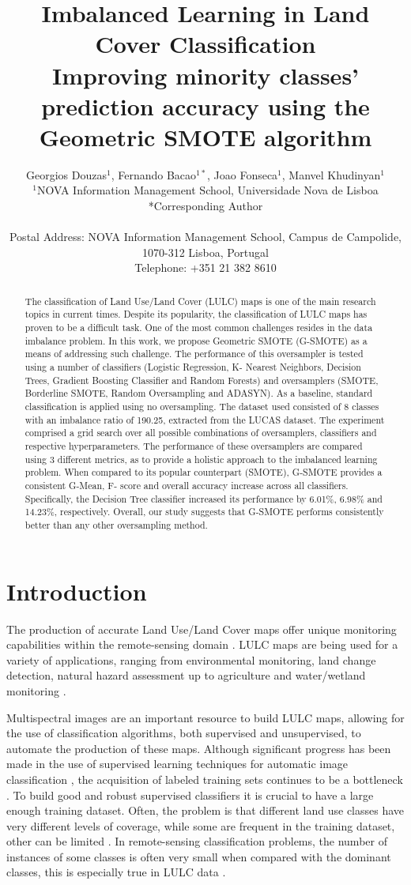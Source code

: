 \documentclass[parskip=full]{scrartcl}
\title{Imbalanced Learning in Land Cover Classification  \\ \LARGE{Improving minority classes' prediction accuracy using the Geometric SMOTE algorithm}}
\author{Georgios Douzas\(^{1}\), Fernando Bacao\(^{1*}\), Joao Fonseca\(^{1}\), Manvel Khudinyan\(^{1}\) 
	\\
	\small{\(^{1}\)NOVA Information Management School, Universidade Nova de Lisboa}
	\\
	\small{*Corresponding Author}
	\\
	\\
	\small{Postal Address: NOVA Information Management School, Campus de Campolide, 1070-312 Lisboa, Portugal}
	\\
	\small{Telephone: +351 21 382 8610}
}
\date{}
\begin{document}
\maketitle

\begin{abstract}
The classification of Land Use/Land Cover (LULC) maps is one of the main
research topics in current times. Despite its popularity, the classification of
LULC maps has proven to be a difficult task. One of the most common challenges
resides in the data imbalance problem. In this work, we propose Geometric SMOTE
(G-SMOTE) as a means of addressing such challenge. The performance of this
oversampler is tested using a number of classifiers (Logistic Regression, K-
Nearest Neighbors, Decision Trees, Gradient Boosting Classifier and Random
Forests) and oversamplers (SMOTE, Borderline SMOTE, Random Oversampling and
ADASYN). As a baseline, standard classification is applied using no
oversampling. The dataset used consisted of 8 classes with an imbalance ratio of
190.25, extracted from the LUCAS dataset. The experiment comprised a grid search
over all possible combinations of oversamplers, classifiers and respective
hyperparameters. The performance of these oversamplers are compared using 3
different metrics, as to provide a holistic approach to the imbalanced learning
problem. When compared to its popular counterpart (SMOTE), G-SMOTE provides a
consistent G-Mean, F- score and overall accuracy increase across all
classifiers. Specifically, the Decision Tree classifier increased its
performance by 6.01\%, 6.98\% and 14.23\%, respectively. Overall, our study
suggests that G-SMOTE performs consistently better than any other oversampling
method.
\end{abstract}

\section{Introduction}
The production of accurate Land Use/Land Cover maps offer unique monitoring
capabilities within the remote-sensing domain \cite{Mellor2015}. LULC maps are
being used for a variety of applications, ranging from environmental monitoring,
land change detection, natural hazard assessment up to agriculture and
water/wetland monitoring \cite{Khatami2016}.

Multispectral images are an important resource to build LULC maps, allowing for
the use of classification algorithms, both supervised and unsupervised, to
automate the production of these maps. Although significant progress has been
made in the use of supervised learning techniques for automatic image
classification \cite{Tewkesbury2015}, the acquisition of labeled training sets
continues to be a bottleneck \cite{Rajan2008}. To build  good and robust
supervised classifiers it is crucial to have a large enough training dataset.
Often, the problem is that different land use classes have very different levels
of coverage, while some are frequent in the training dataset, other can be
limited \cite{Feng2019}. In remote-sensing classification problems, the number
of instances of some classes is often very small when compared with the dominant
classes, this is especially true in LULC data \cite{Williams2009, Cenggoro2018}.
\end{document}
